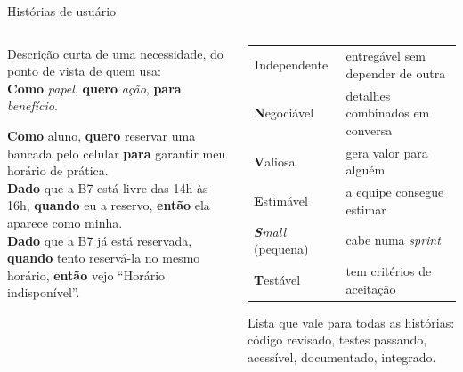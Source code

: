 \documentclass[aspectratio=169,10pt]{beamer}
\begin{document}
\begin{frame}{Histórias de usuário}
  \begin{columns}[T]
    \begin{column}{0.52\textwidth}
      \begin{definicao}
        Descrição curta de uma necessidade, do ponto de vista de quem usa:\\[2pt]
        \textbf{Como} \emph{papel}, \textbf{quero} \emph{ação}, \textbf{para} \emph{benefício}.
      \end{definicao}
      \begin{exemplo}
        \textbf{Como} aluno, \textbf{quero} reservar uma bancada pelo celular \textbf{para} garantir meu horário de prática.\\[2pt]
        \scriptsize
        \textbf{Dado} que a B7 está livre das 14h às 16h, \textbf{quando} eu a reservo, \textbf{então} ela aparece como minha.\\
        \textbf{Dado} que a B7 já está reservada, \textbf{quando} tento reservá-la no mesmo horário, \textbf{então} vejo ``Horário indisponível''.
      \end{exemplo}
    \end{column}
    \begin{column}{0.46\textwidth}
      \scriptsize
      \begin{tabularx}{\linewidth}{@{}l L@{}}
        \toprule
         &  \\
        \midrule
        \textbf{I}ndependente & entregável sem depender de outra \\
        \textbf{N}egociável & detalhes combinados em conversa \\
        \textbf{V}aliosa & gera valor para alguém \\
        \textbf{E}stimável & a equipe consegue estimar \\
        \emph{\textbf{S}mall} (pequena) & cabe numa \emph{sprint} \\
        \textbf{T}estável & tem critérios de aceitação \\
        \bottomrule
      \end{tabularx}
      \begin{definicao}
        Lista que vale para todas as histórias: código revisado, testes passando, acessível, documentado, integrado.
      \end{definicao}
    \end{column}
  \end{columns}
\end{frame}
\end{document}
